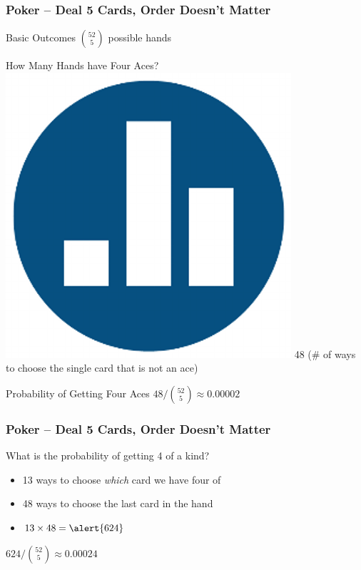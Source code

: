 \documentclass[handout]{beamer}
\begin{document}
\begin{frame}

\frametitle{Poker -- Deal 5 Cards, Order Doesn't Matter}

\begin{block}{Basic Outcomes}
\vspace{0.3em} 
$\displaystyle{52 \choose 5}$ possible hands
\end{block}
\begin{block}{How Many Hands have Four Aces? \hfill \includegraphics[scale = 0.05]{./images/clicker} } \pause
\alert{48 (\# of ways to choose the single card that is not an ace)}
\end{block}

\begin{block}{Probability of Getting Four Aces}
\vspace{0.3em} 
$48/\displaystyle{52 \choose 5} \approx 0.00002$
\end{block}


\end{frame}
\begin{frame}
\frametitle{Poker -- Deal 5 Cards, Order Doesn't Matter}
\begin{block}{What is the probability of getting 4 of a kind?}
	\begin{itemize}
		\item 13 ways to choose \emph{which} card we have four of
		\item 48 ways to choose the last card in the hand 
		\item $13 \times 48 = \alert{624}$ 
	\end{itemize}
\end{block}
\vspace{0.3em} 
$624/\displaystyle{52 \choose 5} \approx 0.00024$

\end{frame}
\end{document}
